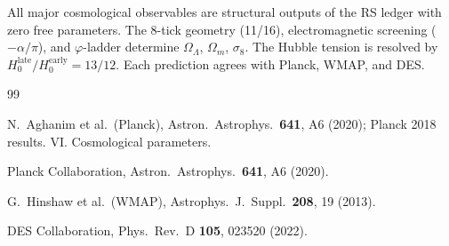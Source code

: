 \documentclass[12pt,a4paper]{article}
\theoremstyle{definition}
\theoremstyle{remark}
\begin{document}
All major cosmological observables are structural outputs of the RS
ledger with zero free parameters.  The 8-tick geometry (11/16),
electromagnetic screening ($-\alpha/\pi$), and $\varphi$-ladder
determine $\Omega_\Lambda$, $\Omega_m$, $\sigma_8$.  The Hubble
tension is resolved by $H_0^{\mathrm{late}}/H_0^{\mathrm{early}} =
13/12$.  Each prediction agrees with Planck, WMAP, and DES.

\begin{thebibliography}{99}

N.~Aghanim et al.\ (Planck), Astron.\ Astrophys.\ \textbf{641}, A6
(2020); Planck 2018 results. VI. Cosmological parameters.

Planck Collaboration, Astron.\ Astrophys.\ \textbf{641}, A6 (2020).

G.~Hinshaw et al.\ (WMAP), Astrophys.\ J.\ Suppl.\ \textbf{208}, 19
(2013).

DES Collaboration, Phys.\ Rev.\ D \textbf{105}, 023520 (2022).

\end{thebibliography}
\end{document}
